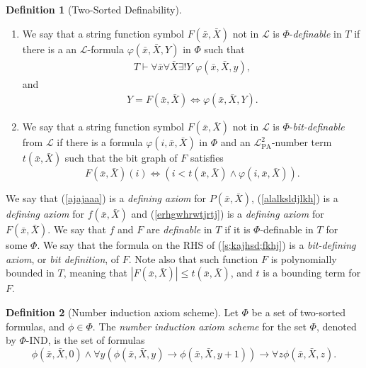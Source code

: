 \documentclass{article}
\theoremstyle{definition}
\newtheorem{df}{Definition}
\theoremstyle{theorem}
\theoremstyle{theorem}
\theoremstyle{remark}
\theoremstyle{remark}
\theoremstyle{example}
\theoremstyle{notation}
\theoremstyle{theorem}
\begin{document}
\begin{df}[Two-Sorted Definability]
\begin{enumerate}
\item We say that a string function symbol $F(\bar x, \bar X)$ not in $\mathcal{L}$ is $\Phi$-\emph{definable} in $T$ if there is a an $\mathcal{L}$-formula $\varphi(\bar x,\bar X,Y)$ in $\Phi$ such that
\begin{gather}\label{erhgwhrwtjrtj}
    T\vdash \forall \bar x\forall \bar X\exists !Y\,\,\varphi(\bar x,\bar X, y),
\end{gather}
and  
\begin{gather}\label{alalksldjlkh}
    Y = F(\bar x, \bar X)\iff \varphi(\bar x,\bar X, Y).
\end{gather} 
\item  We say that a string function symbol $F(\bar x, \bar X)$ not in $\mathcal{L}$ is $\Phi$-\emph{bit-definable} from $\mathcal{L}$ if there is a formula $\varphi(i,\bar x, \bar X)$ in $\Phi$ and an $\mathcal{L}^2_{\mathrm{PA}}$-number term $t(\bar x, \bar X)$ such that the bit graph of $F$ satisfies 
\begin{equation}\label{s;kajhsd;fkhj}
    F(\bar x, \bar X)(i)\iff (i<t(\bar x, \bar X)\wedge \varphi(i,\bar x, \bar X)).
\end{equation}
\end{enumerate}
We say that (\ref{ajajaaa}) is a \emph{defining axiom} for $P(\bar x, \bar X)$, (\ref{alalksldjlkh}) is a \emph{defining axiom}
for $f(\bar x, \bar X)$ and (\ref{erhgwhrwtjrtj}) is a \emph{defining axiom}
for $F(\bar x, \bar X)$. We say that $f$ and $F$ are \emph{definable} in $T$ if it is $\Phi$-definable in $T$ for some $\Phi$. We say that the formula on the RHS of (\ref{s;kajhsd;fkhj}) is a \emph{bit-defining axiom}, or \emph{bit
definition}, of $F$. Note also that such function $F$ is polynomially bounded
in $T$, meaning that $|F(\bar x, \bar X)|\leq t(\bar x, \bar X)$, and $t$ is a bounding term for $F$.
    
\end{df}

\begin{df}[Number induction axiom scheme]
    Let $\Phi$ be a set of two-sorted formulas, and $\phi\in \Phi$. The \emph{number induction axiom scheme} for the set $\Phi$, denoted by $\Phi$-IND, is the set of formulas
\begin{equation}
  \phi(\bar{x},\bar{X},0) \wedge \forall y (\phi(\bar{x},\bar{X},y)\to \phi(\bar{x},\bar{X},y+1))\to \forall z \phi(\bar{x},\bar{X},z).
\end{equation}
\end{df}
\end{document}
